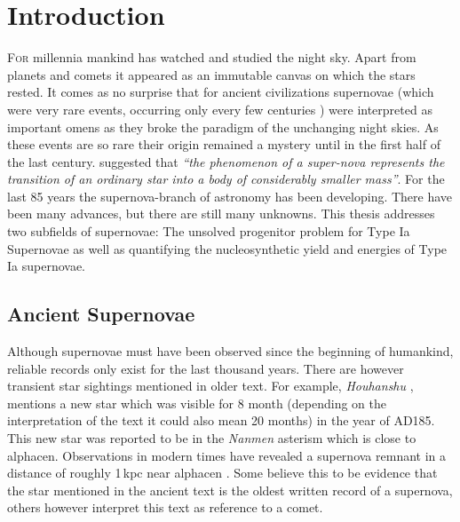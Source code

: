 \chapter{Introduction}
\label{chap:intro}

\lettrine[lines=4]{F}{or} millennia mankind has watched and studied the night sky. Apart from planets and comets it appeared as an immutable canvas on which the stars rested. It comes as no surprise that for ancient civilizations supernovae (which were very rare events, occurring only every few centuries ) were interpreted as important omens as they broke the paradigm of the unchanging night skies. As these events are so rare their origin remained a mystery until in the first half of the last century. \citet{1934PNAS...20..254B} suggested that \textit{``the phenomenon of a super-nova represents the transition of an ordinary star into a body of considerably smaller mass''}. For the last 85 years the supernova-branch of astronomy has been developing. There have been many advances, but there are still many unknowns. This thesis addresses two subfields of supernovae: The unsolved progenitor problem for Type Ia Supernovae as well as quantifying the nucleosynthetic yield and energies of Type Ia supernovae.


\section{Ancient Supernovae}
\label{sec:ancientsn}
Although supernovae must have been observed since the beginning of humankind, reliable records only exist for the last thousand years. There are however transient star sightings mentioned in older text. For example, \textit{Houhanshu} \citep{2006ChJAA...6..635Z}, mentions a new star which was visible for 8 month (depending on the interpretation of the text it could also mean 20 months) in the year of AD185. This new star was reported to be in the \textit{Nanmen} asterism which is close to \gls{alphacen}.  Observations in modern times have revealed a supernova remnant in a distance of roughly 1\,kpc near \gls{alphacen} \citep{2006ChJAA...6..635Z}. Some believe this to be evidence that the star mentioned in the ancient text is  the oldest written record of a supernova, others however interpret this text as reference to a comet. 

